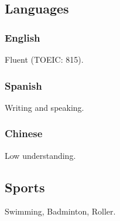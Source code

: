 \documentclass{article}
\begin{document}
\begin{multicols}{2}
            \subsection{Languages}
                \subsubsection{English}
                    Fluent (TOEIC: 815).
                \subsubsection{Spanish}
                    Writing and speaking.
                \subsubsection{Chinese}
                    Low understanding.
                \subsection{Sports}
                    Swimming, Badminton, Roller.
    \end{multicols}
\end{document}
